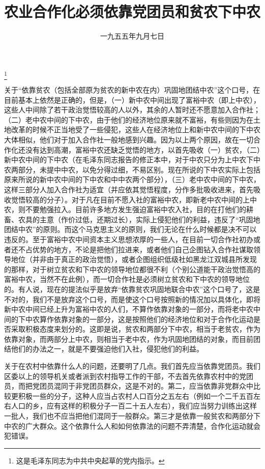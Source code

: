 
\title{农业合作化必须依靠党团员和贫农下中农}
\date{一九五五年九月七日}
\thanks{这是毛泽东同志为中共中央起草的党内指示。}
\maketitle


关于“依靠贫农（包括全部原为贫农的新中农在内）巩固地团结中农”这个口号，在目前基本上依然是正确的，但是，（一）新中农中间出现了富裕中农（即上中农），这些人中间除了若干政治觉悟较高的人以外，其余的人暂时还不愿意加入合作社；（二）老中农中间的下中农，由于他们的经济地位原来就不富裕，有些则因为在土地改革的时候不正当地受了一些侵犯，这些人在经济地位上和新中农中间的下中农大体相似，他们对于加入合作社一般地感到兴趣。因为以上两个原因，故在一切合作化还没有达到高潮，富裕中农还缺乏觉悟的地方，以首先吸收（一）贫农，（二）新中农中间的下中农（在毛泽东同志报告的修正本中，对于中农只分为上中农下中农两部分，未提中中农，以免分得过细，不易区别。现在所说的下中农实际上包括原来所说的新中农中间的下中农和中中农两个部分），（三）老中农中间的下中农，这样三部分人加入合作社为适宜（并应依其觉悟程度，分作多批吸收进来，首先吸收觉悟较高的分子）。对于凡在目前不愿入社的富裕中农，即新老中农中间的上中农，则不要勉强拉入。目前许多地方发生强迫富裕中农入社，目的在打他们的耕畜、农具的主意（作价过低，还期过长），实际上侵犯他们的利益，违反了“巩固地团结中农”的原则。而这个马克思主义的原则，我们无论在什么时候都是决不可以违反的。至于富裕中农中间资本主义思想浓厚的一些人，在目前一切合作社初办或者还不占优势的地方，不论是把他们拉进来，或者他们自己企图钻入合作社谋取领导地位（并非由于真正的政治觉悟），或者企图组织低级社如黑龙江双城县所发现的那样，对于树立贫农和下中农的领导地位都很不利（个别公道能干政治觉悟高的富裕中农，当然不在此例），而一切合作社是必须树立贫农和下中农的领导地位的。有人说，现在的提法似乎是放弃“依靠贫农巩固地联合中农”这个口号了，这是不对的，我们不是放弃这个口号，而是使这个口号按照新的情况加以具体化，即将新中农中间已经上升为富裕中农的人们，不算作依靠对象的一部分，而将老中农中间的下中农算作依靠对象的一部分，这是按照他们的经济地位和对于合作化运动是否采取积极态度来划分的。这即是说，贫农和两部分下中农，相当于老贫农，作为依靠对象，而两部分上中农，则相当于老中农，作为巩固地团结的对象，而目前团结他们的办法之一，就是不要强迫他们入社，侵犯他们的利益。

关于在农村中依靠什么人的问题，还要明了几点。我们首先应当依靠党团员。我们区委以上的领导机关或者派到农村指导工作的干部，不去首先依靠农村中的党团员，而把党团员混同于非党团员群众，这是不对的。第二，应当依靠非党群众中比较更积极一些的分子，这种人应当占农村人口百分之五左右（例如一个二千五百左右人口的乡，应有这样的积极分子一百二十五人左右），我们应当努力训练出这样一批人，我们也不应当把他们混同于一般群众。第三才是依靠一般贫农和两部分下中农的广大群众。这个依靠什么人和如何依靠法的问题不弄清楚，合作化运动就会犯错误。

